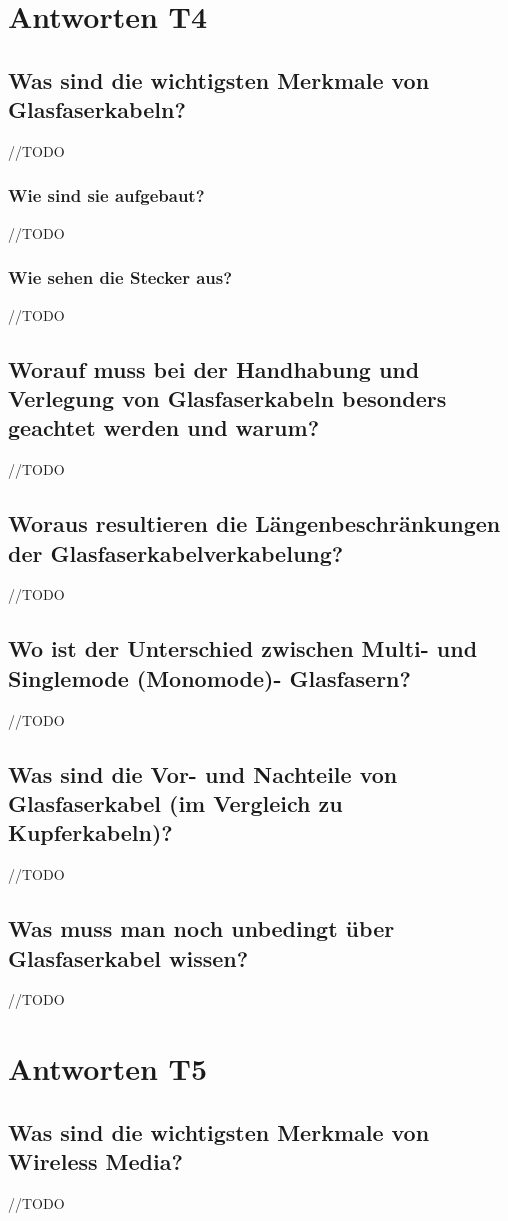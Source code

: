 \section{Antworten T4}
\subsection*{Was sind die wichtigsten Merkmale von Glasfaserkabeln?}
//TODO
\subsubsection*{Wie sind sie aufgebaut?}
//TODO
\subsubsection*{Wie sehen die Stecker aus?}
//TODO
\subsection*{Worauf muss bei der Handhabung und Verlegung von Glasfaserkabeln besonders geachtet werden und warum?}
//TODO
\subsection*{Woraus resultieren die Längenbeschränkungen der Glasfaserkabelverkabelung?}
//TODO
\subsection*{Wo ist der Unterschied zwischen Multi- und Singlemode (Monomode)- Glasfasern?}
//TODO
\subsection*{Was sind die Vor- und Nachteile von Glasfaserkabel (im Vergleich zu Kupferkabeln)?}
//TODO
\subsection*{Was muss man noch unbedingt über Glasfaserkabel wissen?}
//TODO

\section{Antworten T5}
\subsection*{Was sind die wichtigsten Merkmale von \flqq{}Wireless Media\frqq?}
//TODO
